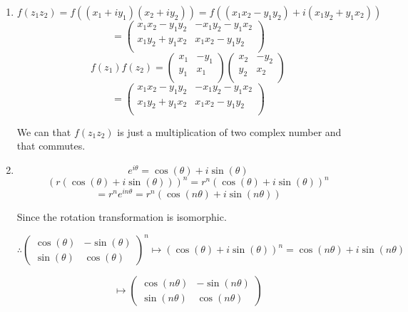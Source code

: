 \documentclass[12pt]{article}
\begin{document}
\begin{enumerate}
    \item
          \[
              f\left(z_{1} z_{2}\right) = f((x_1 + iy_1)(x_2 + iy_2)) = f((x_1x_2 - y_1y_2) + i(x_1y_2 + y_1x_2))
          \]
          \[
              =\begin{pmatrix}
                  x_1x_2 - y_1y_2 & -x_1y_2 - y_1x_2 \\
                  x_1y_2 + y_1x_2 & x_1x_2 - y_1y_2  \\
              \end{pmatrix}
          \]
          \[
              f\left(z_{1}\right) f\left(z_{2}\right) = \begin{pmatrix}
                  x_1 & -y_1 \\
                  y_1 & x_1  \\
              \end{pmatrix}\begin{pmatrix}
                  x_2 & -y_2 \\
                  y_2 & x_2  \\
              \end{pmatrix}
          \]
          \[
              = \begin{pmatrix}
                  x_1x_2 - y_1y_2 & -x_1y_2 - y_1x_2 \\
                  x_1y_2 + y_1x_2 & x_1x_2 - y_1y_2  \\
              \end{pmatrix}
          \]

          We can that \(f\left(z_{1} z_{2}\right)\) is just a multiplication of two complex number and that commutes.
    \item \[
              e^{i\theta} = \cos(\theta) + i\sin(\theta)
          \]
          \begin{equation}
              {(r(\cos (\theta)+i \sin (\theta)))}^{n}=r^{n}{(\cos (\theta) + i \sin (\theta))}^n
          \end{equation}
          \[
              =r^{n}e^{in\theta} =  r^{n}(\cos(n\theta) + i\sin(n\theta))
          \]

          Since the rotation transformation is isomorphic.

          \[
              \therefore \left(\begin{array}{cc}
                  \cos (\theta) & -\sin (\theta) \\
                  \sin (\theta) & \cos (\theta)
              \end{array}\right)^{n} \mapsto {(\cos(\theta) + i\sin(\theta))}^n = \cos(n\theta) + i\sin(n\theta)
          \]

          \[
              \mapsto \left(\begin{array}{cc}
                      \cos (n \theta) & -\sin (n \theta) \\
                      \sin (n \theta) & \cos (n \theta)
                  \end{array}\right)
          \]

\end{enumerate}

\newpage



\nocite{El-Deeb_PEU-453_Assignments}
\end{document}

